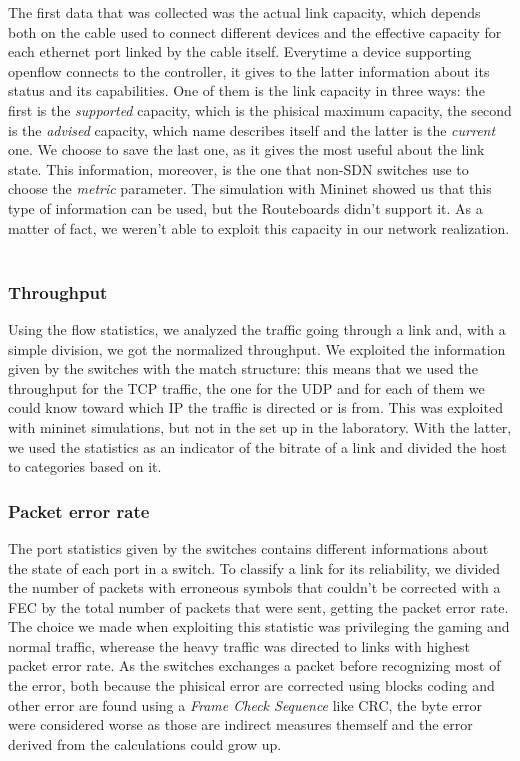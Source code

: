 \documentclass[article,10pt]{IEEEtran}
\begin{document}
	The first data that was collected was the actual link capacity, which depends both on the cable used to connect
	different devices and the effective capacity for each ethernet port linked by the cable itself. Everytime a device supporting
	openflow connects to the controller, it gives to the latter information about its status and its capabilities. One of them is
	the link capacity in three ways: the first is the \textit{supported} capacity, which is the phisical maximum capacity, the second is the
	\textit{advised} capacity, which name describes itself and the latter is the \textit{current} one. We choose to save the last one,
	as it gives the most useful about the link state. This information, moreover, is the one that non-SDN switches use to choose the \textit{metric}
	parameter. The simulation with Mininet showed us that this type of information can be used, but the Routeboards didn't support it.
	As a matter of fact, we weren't able to exploit this capacity in our network realization.
		\\
		\\
  \subsubsection{Throughput}

	Using the flow statistics, we analyzed the traffic going through a link and, with a simple division, we got the normalized throughput.
	We exploited the information given by the switches with the match structure: this means that we used the throughput for the TCP traffic,
	the one for the UDP and for each of them we could know toward which IP the traffic is directed or is from. This was exploited with mininet
	simulations, but not in the set up in the laboratory. With the latter, we used the statistics as an indicator of the bitrate of a link
	and divided the host to categories based on it.
\\
\subsubsection{Packet error rate}
The port statistics given by the switches contains different informations about the state of each port in a switch. To classify a link for its
reliability, we divided the number of packets with erroneous symbols that couldn't be corrected with a FEC by the total number of packets that were sent,
getting the packet error rate. The choice we made when exploiting this statistic was privileging the gaming and normal traffic, wherease the
heavy traffic was directed to links with highest packet error rate.  As the switches exchanges a packet before recognizing most of the error, both because the
phisical error are corrected using blocks coding and other error are found using a \textit{Frame Check Sequence} like CRC, the byte error were considered worse as
those are indirect measures themself and the error derived from the calculations could grow up.
\end{document}
